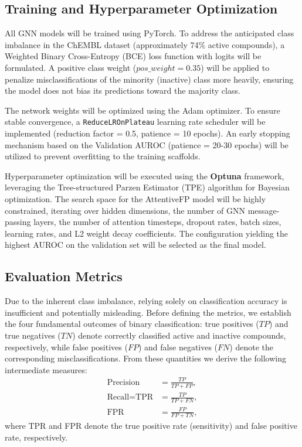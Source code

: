 \subsection{Training and Hyperparameter Optimization}

All GNN models will be trained using PyTorch. To address the anticipated class imbalance in the ChEMBL dataset (approximately 74\% active compounds), a Weighted Binary Cross-Entropy (BCE) loss function with logits will be formulated. A positive class weight ($pos\_weight = 0.35$) will be applied to penalize misclassifications of the minority (inactive) class more heavily, ensuring the model does not bias its predictions toward the majority class.

The network weights will be optimized using the Adam optimizer. To ensure stable convergence, a \texttt{ReduceLROnPlateau} learning rate scheduler will be implemented (reduction factor = 0.5, patience = 10 epochs). An early stopping mechanism based on the Validation AUROC (patience = 20-30 epochs) will be utilized to prevent overfitting to the training scaffolds.

Hyperparameter optimization will be executed using the \textbf{Optuna} framework, leveraging the Tree-structured Parzen Estimator (TPE) algorithm for Bayesian optimization. The search space for the AttentiveFP model will be highly constrained, iterating over hidden dimensions, the number of GNN message-passing layers, the number of attention timesteps, dropout rates, batch sizes, learning rates, and L2 weight decay coefficients. The configuration yielding the highest AUROC on the validation set will be selected as the final model.

\subsection{Evaluation Metrics}

Due to the inherent class imbalance, relying solely on classification accuracy is insufficient and potentially misleading. Before defining the metrics, we establish the four fundamental outcomes of binary classification: true positives ($TP$) and true negatives ($TN$) denote correctly classified active and inactive compounds, respectively, while false positives ($FP$) and false negatives ($FN$) denote the corresponding misclassifications. From these quantities we derive the following intermediate measures:
\begin{align}
    \text{Precision} &= \frac{TP}{TP + FP}, \\
    \text{Recall} = \text{TPR} &= \frac{TP}{TP + FN}, \\
    \text{FPR} &= \frac{FP}{FP + TN},
\end{align}
where TPR and FPR denote the true positive rate (sensitivity) and false positive rate, respectively.

